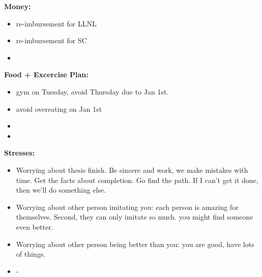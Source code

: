 \documentclass[11pt]{article}
\begin{document}
{            \textbf{Money:}\\ 
            \begin{itemize} 
              \tiny \item \tiny re-imbursement for LLNL 
            \item \tiny re-imbursement for SC 
            \item \tiny 
            \end{itemize}

            \textbf{Food + Excercise Plan:}\\
            \begin{itemize}
            \tiny \item \tiny gym on Tuesday, avoid Thursday due to Jan 1st. 
            \item \tiny avoid overeating on Jan 1st 
            \item \tiny 
              \item \tiny 
            \end{itemize}
            \textbf{Stresses:}\\
            \begin{itemize}
              \tiny \item \tiny Worrying about thesis finish. Be sincere and work, we make mistakes with time. Get the facts about completion. Go
              find the path. If I can't get it done, then we'll do something
              else.
            \item \tiny Worrying about other person imitating you: each person is amazing for themselves. Second, they can only imitate so much. you might find someone even better. 
            \item \tiny Worrying about other person being better than you: you are good, have lots of things.  
            \item \tiny -
            \end{itemize}

}
\end{document}
